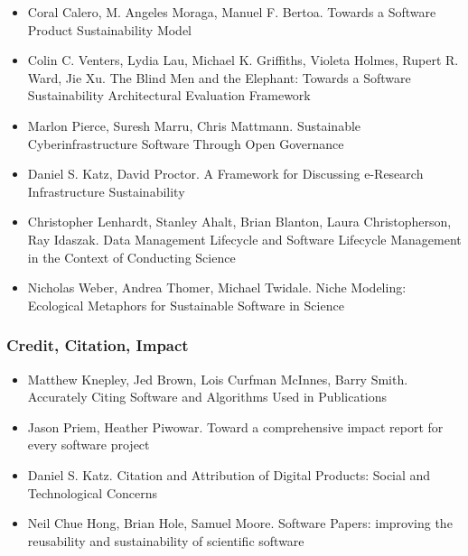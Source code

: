 \documentclass[11pt, oneside]{amsart}
\begin{document}
\begin{itemize}

\item Coral Calero, M. Angeles Moraga, Manuel F. Bertoa. Towards a Software Product Sustainability Model \cite{Calero_WSSSPE}

\item Colin C. Venters, Lydia Lau, Michael K. Griffiths, Violeta Holmes, Rupert R. Ward, Jie Xu. The Blind Men and the Elephant: Towards a Software Sustainability Architectural Evaluation Framework \cite{Venters_WSSSPE}

\item Marlon Pierce, Suresh Marru, Chris Mattmann. Sustainable Cyberinfrastructure Software Through Open Governance \cite{Pierce_WSSSPE}

\item Daniel S. Katz, David Proctor. A Framework for Discussing e-Research Infrastructure Sustainability \cite{Katz_WSSSPE}

\item Christopher Lenhardt, Stanley Ahalt, Brian Blanton, Laura Christopherson, Ray Idaszak. Data Management Lifecycle and Software Lifecycle Management in the Context of Conducting Science \cite{Lenhardt_WSSSPE}

\item Nicholas Weber, Andrea Thomer, Michael Twidale. Niche Modeling: Ecological Metaphors for Sustainable Software in Science \cite{Weber_WSSSPE}

\end{itemize}

\subsubsection{Credit, Citation, Impact}

\begin{itemize}

\item Matthew Knepley, Jed Brown, Lois Curfman McInnes, Barry Smith. Accurately Citing Software and Algorithms Used in Publications \cite{Knepley_WSSSPE}

\item Jason Priem, Heather Piwowar. Toward a comprehensive impact report for every software project \cite{Priem_WSSSPE}

\item Daniel S. Katz. Citation and Attribution of Digital Products: Social and Technological Concerns \cite{Katz2_WSSSPE}

\item Neil Chue Hong, Brian Hole, Samuel Moore. Software Papers: improving the reusability and sustainability of scientific software \cite{Chue_Hong_WSSSPE}

\end{itemize}
\end{document}
